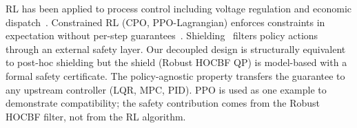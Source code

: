RL has been applied to process control including voltage regulation and economic dispatch~\cite{zhang2021deep}. Constrained RL (CPO, PPO-Lagrangian) enforces constraints in expectation without per-step guarantees~\cite{achiam2017constrained}. Shielding~\cite{alshiekh2018safe} filters policy actions through an external safety layer. Our decoupled design is structurally equivalent to post-hoc shielding but the shield (Robust HOCBF QP) is model-based with a formal safety certificate. The policy-agnostic property transfers the guarantee to any upstream controller (LQR, MPC, PID). PPO is used as one example to demonstrate compatibility; the safety contribution comes from the Robust HOCBF filter, not from the RL algorithm.
